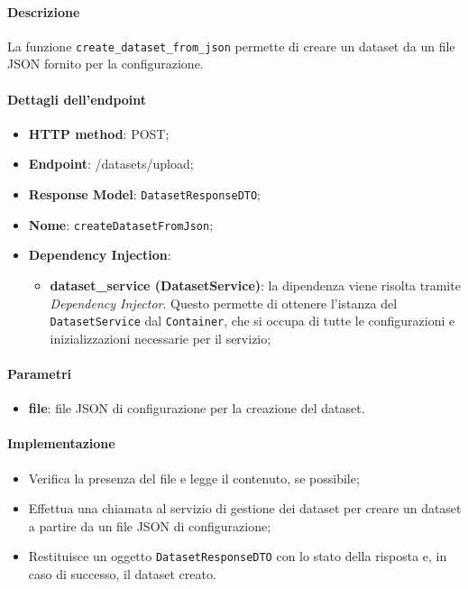\paragraph{Descrizione}
La funzione \texttt{create\_dataset\_from\_json} permette di creare un dataset da un file JSON fornito per la configurazione.
\paragraph{Dettagli dell'endpoint}
\begin{itemize}
    \item \textbf{HTTP method}: POST;
    \item \textbf{Endpoint}: /datasets/upload;
    \item \textbf{Response Model}: \texttt{DatasetResponseDTO};
    \item \textbf{Nome}: \texttt{createDatasetFromJson};
    \item \textbf{Dependency Injection}: 
    \begin{itemize}
        \item \textbf{dataset\_service (DatasetService)}: la dipendenza viene risolta tramite \textit{Dependency Injector}. Questo permette di ottenere l'istanza del \texttt{DatasetService} dal \texttt{Container}, che si occupa di tutte le configurazioni e inizializzazioni necessarie per il servizio;
    \end{itemize}
\end{itemize}
\paragraph{Parametri}
\begin{itemize}
    \item \textbf{file}: file JSON di configurazione per la creazione del dataset.
\end{itemize}
\paragraph{Implementazione}
\begin{itemize}
    \item Verifica la presenza del file e legge il contenuto, se possibile;
    \item Effettua una chiamata al servizio di gestione dei dataset per creare un dataset a partire da un file JSON di configurazione;
    \item Restituisce un oggetto \texttt{DatasetResponseDTO} con lo stato della risposta e, in caso di successo, il dataset creato.
\end{itemize}

